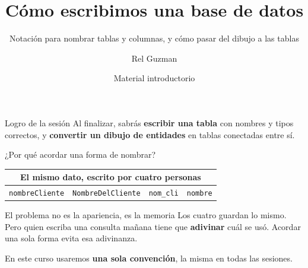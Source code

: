 \documentclass[aspectratio=169,10pt,c]{beamer}
\title{Cómo escribimos una base de datos}
\subtitle{Notación para nombrar tablas y columnas, y cómo pasar del dibujo a las tablas}
\date{Material introductorio}
\author{Rel Guzman}
\begin{document}
{\maketitle}

\begin{frame}[c]
\begin{block}{Logro de la sesión}
Al finalizar, sabrás \textbf{escribir una tabla} con nombres y tipos correctos, y \textbf{convertir un dibujo de entidades} en tablas conectadas entre sí.
\end{block}
\end{frame}

\begin{frame}{¿Por qué acordar una forma de nombrar?}
\begin{center}
\small
\begin{tabular}{cccc}
\toprule
\multicolumn{4}{c}{\bfseries El mismo dato, escrito por cuatro personas} \\
\midrule
\texttt{nombreCliente} & \texttt{NombreDelCliente} & \texttt{nom\_cli} & \texttt{nombre} \\
\bottomrule
\end{tabular}
\end{center}
\vspace{0.45cm}
\begin{alertblock}{El problema no es la apariencia, es la memoria}
\small Los cuatro guardan lo mismo. Pero quien escriba una consulta mañana tiene que \textbf{adivinar} cuál se usó. Acordar una sola forma evita esa adivinanza.
\end{alertblock}
\vspace{0.15cm}
\small En este curso usaremos \textbf{una sola convención}, la misma en todas las sesiones.
\end{frame}
\end{document}
